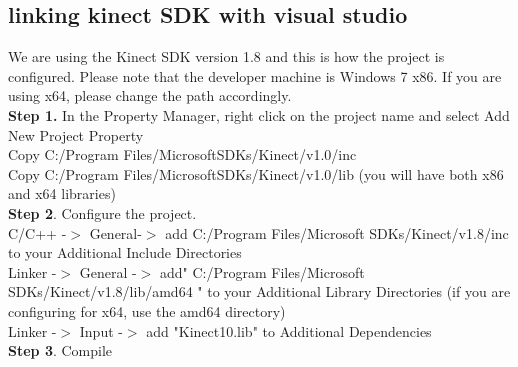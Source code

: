  
\subsection{linking  kinect SDK with visual studio}

We are using the Kinect SDK version 1.8 and this is how the project is configured. Please note that the developer machine is Windows 7 x86. 
If you are using x64, please change the path accordingly.\\
\textbf{Step 1. } In the Property Manager, right click on the project name and select Add New Project Property\\
Copy C:/Program Files/MicrosoftSDKs/Kinect/v1.0/inc\\
Copy C:/Program Files/MicrosoftSDKs/Kinect/v1.0/lib (you will have both x86 and x64 libraries)\\
\textbf{Step 2}. Configure the project. \\
C/C++ -$>$ General-$>$ add C:/Program Files/Microsoft SDKs/Kinect/v1.8/inc to your Additional Include Directories\\
Linker -$>$ General -$>$ add" C:/Program Files/Microsoft SDKs/Kinect/v1.8/lib/amd64 "  to your Additional Library Directories (if you are configuring for x64, use the amd64 directory)\\
Linker -$>$ Input -$>$ add "Kinect10.lib" to Additional Dependencies\\
\textbf{Step 3}. Compile\\
